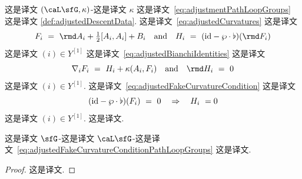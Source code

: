 \documentclass[
    affil-it, %
    auth-lg, %
    british, %
    compression, %
    contents, %
    custom-packages={}, %
    references={bigone}, %
]{lib/preprint}
\newcommand{\boundary}{\flat}
\begin{document}
\begin{body}
 这是译文 $(\caL\sfG,\kappa)$-这是译文 $\kappa$ 这是译文~\eqref{eq:adjustmentPathLoopGroups} 这是译文 \cref{def:adjustedDescentData}. 这是译文~\eqref{eq:adjustedCurvatures} 这是译文         \begin{equation}\label{eq:curvature_LG_kompressed}
            F_i\ =\ \rmd A_i+\tfrac12[A_i,A_i]+B_i
            \eand
            H_i\ =\ (\id-\wp\cdot\boundary)(\rmd F_i)
        \end{equation}  这是译文 $(i)\in Y^{[1]}$ 这是译文~\eqref{eq:adjustedBianchiIdentities} 这是译文         \begin{equation}
            \nabla_i F_i\ =\ H_i+\kappa(A_i,F_i)
            \eand
            \rmd H_i\ =\ 0
        \end{equation}  这是译文 $(i)\in Y^{[1]}$. 这是译文~\eqref{eq:adjustedFakeCurvatureCondition} 这是译文         \begin{equation}\label{eq:adjustedFakeCurvatureConditionPathLoopGroups}
            (\id-\wp\cdot\boundary)(F_i)\ =\ 0
            \quad\Rightarrow\quad
            H_i\ = 0
        \end{equation}  这是译文 $(i)\in Y^{[1]}$. 这是译文.

        \begin{proposition}
            这是译文 $\sfG$-这是译文 $\caL\sfG$-这是译文~\eqref{eq:adjustedFakeCurvatureConditionPathLoopGroups} 这是译文.
        \end{proposition}

        \begin{proof}
            这是译文. 


\end{proof}
\end{body}
\end{document}
